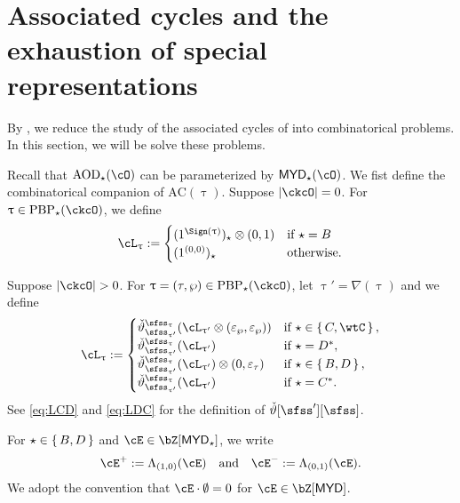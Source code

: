 \documentclass[12pt,a4paper]{amsart}
\newcommand{\AC}{\mathrm{AC}}
\def\MYD{{\mathsf{MYD}}}
\def\abs#1{\left|{#1}\right|}
\def\DD{\nabla}
\numberwithin{equation}{section}
\theoremstyle{remark}
\def\uptaup{\uptau^{\prime}}
\def\PBP{\mathrm{PBP}}
\begin{document}
\section{Associated cycles and the exhaustion of special representations} \label{sec:ACC}

\def\dsign{{}^d\mathrm{Sign}}

\def\acm{\cL}
\def\acme{\tilde{\cL}}

By ,
 we reduce the study of the associated cycles of into 
 combinatorical problems.
In this section, we  will be solve these problems. 

Recall that $\AOD_{\star}(\cO)$ can be parameterized by $\MYD_{\star}(\cO)$. 
We fist define the combinatorical companion of $\AC(\uptau)$.
Suppose $\abs{\ckcO}=0$. For $\uptau\in \PBP_{\star}(\ckcO)$, we define
\[
  \ac_{\uptau} :=
  \begin{cases}
   (1^{\Sign(\uptau)})_{\star}\lotimes(0,1) & \text{if } \star=B\\
   (1^{(0,0)})_{\star} & \text{otherwise}.
  \end{cases}
\]

Suppose $\abs{\ckcO} >0$. For $\uptau = (\tau,\wp)\in \PBP_{\star}(\ckcO)$, let
$\uptau' = \DD(\uptau)$ and we define
\[
\ac_{\uptau} :=
\begin{cases}
  \dliftv[\sfss_{\uptau'}][\sfss_{\uptau}](\ac_{\uptaup}\lotimes (\varepsilon_{\wp},\varepsilon_{\wp}))
  & \text{if } \star\in \set{C,\wtC},\\
  \dliftv[\sfss_{\uptau'}][\sfss_{\uptau}](\ac_{\uptaup})
  & \text{if } \star = D^{*}, \\
  \dliftv[\sfss_{\uptau'}][\sfss_{\uptau}](\ac_{\uptaup})\lotimes (0,\varepsilon_{\tau})
  & \text{if } \star \in \set{B,D}, \\
  \dliftv[\sfss_{\uptau'}][\sfss_{\uptau}](\ac_{\uptaup})
  & \text{if } \star = C^{*}.
\end{cases}
\]
See  \eqref{eq:LCD} and \eqref{eq:LDC} for the definition of $\dlift[\sfss'][\sfss]$.

For $\star\in \set{B,D}$ and $\cE\in \bZ[\MYD_{\star}]$, we write
\[
\cE^{+} := \Lambda_{(1,0)}(\cE) \AND \cE^{-} := \Lambda_{(0,1)}(\cE).
\]
We adopt the convention that $\cE\cdot \emptyset = 0$ for $\cE\in\bZ[\MYD]$.
\end{document}

